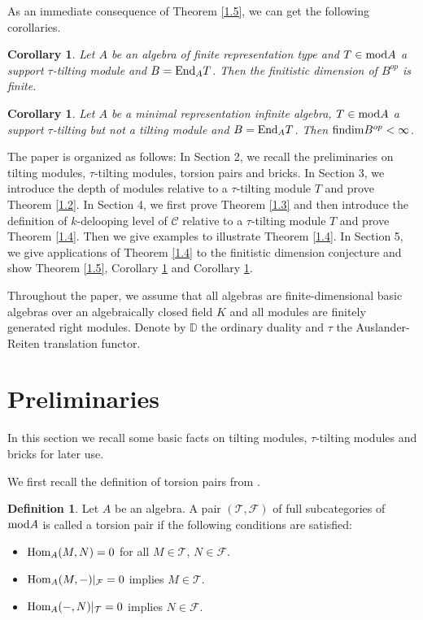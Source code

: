 \documentclass[a4paper]{amsart}
\newtheorem{cor}[thm]{Corollary}
\theoremstyle{definition}
\newtheorem{defn}[thm]{Definition}
\theoremstyle{remark}
\numberwithin{equation}{section}
\begin{document}
As an immediate consequence of Theorem \ref{1.5}, we can get the following corollaries.

\begin{cor}\label{1.6} Let $A$ be an algebra of finite representation type and $T\in {\rm mod}A$ a support $\tau$-tilting module and $B={\rm End}_A T$. Then the finitistic dimension of $B^{op}$ is finite.
\end{cor}

\begin{cor}\label{1.7} Let $A$ be a minimal representation infinite algebra, $T\in {\rm mod}A$ a support $\tau$-tilting but not a tilting module and $B={\rm End}_A T$. Then ${\rm findim}B^{op}<\infty$.
\end{cor}

The paper is organized as follows: In Section 2, we recall the preliminaries on tilting modules, $\tau$-tilting modules, torsion pairs and bricks. In Section 3, we introduce the depth of modules relative to a $\tau$-tilting module $T$ and prove Theorem \ref{1.2}. In Section 4, we first prove Theorem \ref{1.3} and then introduce the definition of $k$-delooping level of $\mathcal{C}$ relative to a $\tau$-tilting module $T$ and prove Theorem \ref{1.4}. Then we give examples to illustrate Theorem \ref{1.4}. In Section 5, we give applications of Theorem \ref{1.4} to the finitistic dimension conjecture and show Theorem \ref{1.5}, Corollary \ref{1.6}  and Corollary \ref{1.7}.

Throughout the paper, we assume that all algebras are finite-dimensional basic algebras over an algebraically closed field $K$ and all modules are finitely generated right modules. Denote by $\mathbb{D}$ the ordinary duality and $\tau$ the Auslander-Reiten translation functor.



\section{Preliminaries}

 In this section we recall some basic facts on tilting modules, $\tau$-tilting modules and bricks for later use.

We first recall the definition of torsion pairs from \cite{ASS}.
\begin{defn}\label{2.1}Let $A$ be an algebra. A pair $(\mathcal{T}, \mathcal{F})$ of full subcategories of $\textup{mod}A$ is called a torsion pair if the following conditions are satisfied:
\begin{itemize}

  \item [(1)]  $\textup{Hom}_A(M, N)=0$ for all $M \in \mathcal{T}$, $N \in \mathcal{F}$.

 \item [(2)] $\textup{Hom}_A(M, -)|_\mathcal{F}=0$ implies $M \in \mathcal{T}$.

 \item [(3)] $\textup{Hom}_A(-, N)|_\mathcal{T}=0$ implies $N \in \mathcal{F}$.
\end{itemize}
\end{defn}
\end{document}
